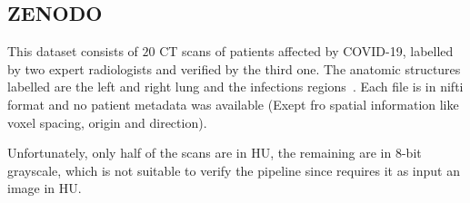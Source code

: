 \documentclass{standalone}
\begin{document}
	\subsection{ZENODO}

	This dataset consists of $20$ CT scans of patients affected by COVID-19, labelled by two expert radiologists and verified by the third one. 
	The anatomic structures labelled are the left and right lung and the infections regions~\cite{DATA:ZENODO}. 
	Each file is in nifti format and no patient metadata was available (Exept fro spatial information like voxel spacing, origin and direction).

	Unfortunately, only half of the scans are in HU, the remaining are in 8-bit grayscale, which is not suitable to verify the pipeline since requires it as input an image in HU.
\end{document}
